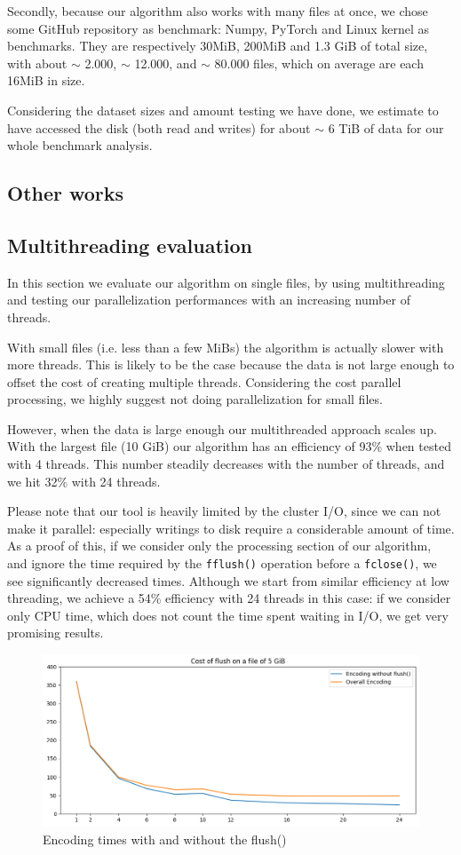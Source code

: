 Secondly, because our algorithm also works with many files at once, we chose some GitHub repository as benchmark: Numpy, PyTorch and Linux kernel as benchmarks. They are respectively 30MiB, 200MiB and  1.3 GiB of total size, with about $\sim$ 2.000, $\sim$ 12.000, and  $\sim$ 80.000 files, which on average are each 16MiB in size.

Considering the dataset sizes and amount testing we have done, we estimate to have accessed the disk (both read and writes) for about $\sim$ 6 TiB of data for our whole benchmark analysis.

\subsection{Other works}

\subsection{Multithreading evaluation}
In this section we evaluate our algorithm on single files, by using multithreading and testing our parallelization performances with an increasing number of threads.

With small files (i.e. less than a few MiBs) the algorithm is actually slower with more threads. This is likely to be the case because the data is not large enough to offset the cost of creating multiple threads. Considering the cost parallel processing, we highly suggest not doing parallelization for small files.

However, when the data is large enough our multithreaded approach scales up. With the largest file (10 GiB) our algorithm has an efficiency of 93\% when tested with 4 threads. This number steadily decreases with the number of threads, and we hit 32\% with 24 threads.

Please note that our tool is heavily limited by the cluster I/O, since we can not make it parallel: especially writings to disk require a considerable amount of time. As a proof of this, if we consider only the processing section of our algorithm, and ignore the time required by the \verb|fflush()| operation before a \verb|fclose()|, we see significantly decreased times. Although we start from similar efficiency at low threading, we achieve a 54\% efficiency with 24 threads in this case: if we consider only CPU time, which does not count the time spent waiting in I/O, we get very promising results.

\begin{figure}
	\centering
	\includegraphics[width=0.8\linewidth]{"../imgs/Flush vs non Flush"}
	\caption{Encoding times with and without the flush()}
	\label{fig:flush-vs-non-flush}
\end{figure}

